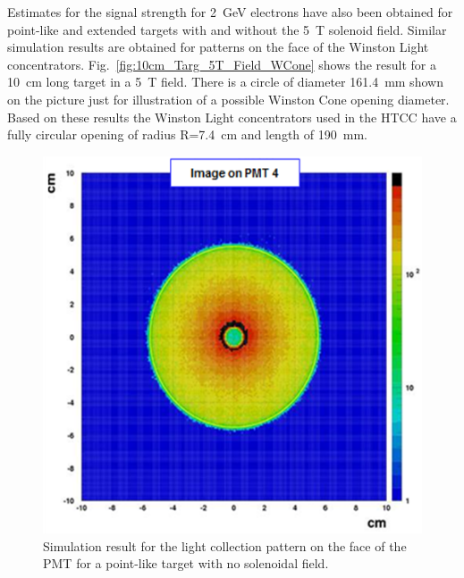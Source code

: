 Estimates for the signal strength for 2~GeV electrons have also been obtained for point-like and extended targets
with and without the 5~T solenoid field. Similar simulation results are obtained for patterns on the face of the
Winston Light concentrators. Fig.~\ref{fig:10cm_Targ_5T_Field_WCone} shows the result for a 10~cm long target
in a 5~T field. There is a circle of diameter 161.4~mm shown on the picture just for illustration of a possible Winston
Cone opening diameter. Based on these results the Winston Light concentrators used in the HTCC have a fully circular
opening of radius R=7.4~cm and length of 190~mm. 

\begin{figure}[!ht]
    \centering
    \includegraphics[width=1.0\linewidth,trim={0.0cm 0.0cm 0.0cm 0.0cm},clip]{images/Point_Targ_Zero_Field_PMT.png}
    \caption{Simulation result for the light collection pattern on the face of the PMT for a point-like target with no
      solenoidal field.}
    \label{fig:Point_Targ_Zero_Field_PMT}
\end{figure}

